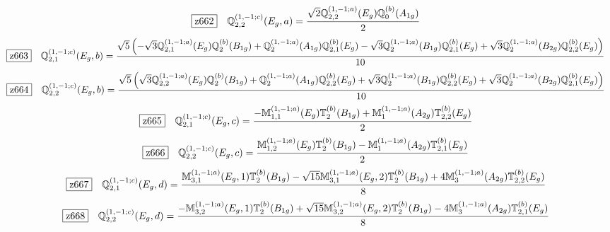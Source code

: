 \documentclass[fleqn,10pt,landscape]{jsarticle}
\begin{document}
\begin{dmath*}
\hspace*{3mm}\fbox{z662}\quad \mathbb{Q}_{2,2}^{(1,-1;c)}(E_{g},a)=\frac{\sqrt{2} \mathbb{Q}_{2,2}^{(1,-1;a)}(E_{g}) \mathbb{Q}_{0}^{(b)}(A_{1g})}{2}
\end{dmath*}
\begin{dmath*}
\hspace*{3mm}\fbox{z663}\quad \mathbb{Q}_{2,1}^{(1,-1;c)}(E_{g},b)=\frac{\sqrt{5} \left(- \sqrt{3} \mathbb{Q}_{2,1}^{(1,-1;a)}(E_{g}) \mathbb{Q}_{2}^{(b)}(B_{1g}) + \mathbb{Q}_{2}^{(1,-1;a)}(A_{1g}) \mathbb{Q}_{2,1}^{(b)}(E_{g}) - \sqrt{3} \mathbb{Q}_{2}^{(1,-1;a)}(B_{1g}) \mathbb{Q}_{2,1}^{(b)}(E_{g}) + \sqrt{3} \mathbb{Q}_{2}^{(1,-1;a)}(B_{2g}) \mathbb{Q}_{2,2}^{(b)}(E_{g})\right)}{10}
\end{dmath*}
\begin{dmath*}
\hspace*{3mm}\fbox{z664}\quad \mathbb{Q}_{2,2}^{(1,-1;c)}(E_{g},b)=\frac{\sqrt{5} \left(\sqrt{3} \mathbb{Q}_{2,2}^{(1,-1;a)}(E_{g}) \mathbb{Q}_{2}^{(b)}(B_{1g}) + \mathbb{Q}_{2}^{(1,-1;a)}(A_{1g}) \mathbb{Q}_{2,2}^{(b)}(E_{g}) + \sqrt{3} \mathbb{Q}_{2}^{(1,-1;a)}(B_{1g}) \mathbb{Q}_{2,2}^{(b)}(E_{g}) + \sqrt{3} \mathbb{Q}_{2}^{(1,-1;a)}(B_{2g}) \mathbb{Q}_{2,1}^{(b)}(E_{g})\right)}{10}
\end{dmath*}
\begin{dmath*}
\hspace*{3mm}\fbox{z665}\quad \mathbb{Q}_{2,1}^{(1,-1;c)}(E_{g},c)=\frac{- \mathbb{M}_{1,1}^{(1,-1;a)}(E_{g}) \mathbb{T}_{2}^{(b)}(B_{1g}) + \mathbb{M}_{1}^{(1,-1;a)}(A_{2g}) \mathbb{T}_{2,2}^{(b)}(E_{g})}{2}
\end{dmath*}
\begin{dmath*}
\hspace*{3mm}\fbox{z666}\quad \mathbb{Q}_{2,2}^{(1,-1;c)}(E_{g},c)=\frac{\mathbb{M}_{1,2}^{(1,-1;a)}(E_{g}) \mathbb{T}_{2}^{(b)}(B_{1g}) - \mathbb{M}_{1}^{(1,-1;a)}(A_{2g}) \mathbb{T}_{2,1}^{(b)}(E_{g})}{2}
\end{dmath*}
\begin{dmath*}
\hspace*{3mm}\fbox{z667}\quad \mathbb{Q}_{2,1}^{(1,-1;c)}(E_{g},d)=\frac{\mathbb{M}_{3,1}^{(1,-1;a)}(E_{g},1) \mathbb{T}_{2}^{(b)}(B_{1g}) - \sqrt{15} \mathbb{M}_{3,1}^{(1,-1;a)}(E_{g},2) \mathbb{T}_{2}^{(b)}(B_{1g}) + 4 \mathbb{M}_{3}^{(1,-1;a)}(A_{2g}) \mathbb{T}_{2,2}^{(b)}(E_{g})}{8}
\end{dmath*}
\begin{dmath*}
\hspace*{3mm}\fbox{z668}\quad \mathbb{Q}_{2,2}^{(1,-1;c)}(E_{g},d)=\frac{- \mathbb{M}_{3,2}^{(1,-1;a)}(E_{g},1) \mathbb{T}_{2}^{(b)}(B_{1g}) + \sqrt{15} \mathbb{M}_{3,2}^{(1,-1;a)}(E_{g},2) \mathbb{T}_{2}^{(b)}(B_{1g}) - 4 \mathbb{M}_{3}^{(1,-1;a)}(A_{2g}) \mathbb{T}_{2,1}^{(b)}(E_{g})}{8}
\end{dmath*}
\end{document}
